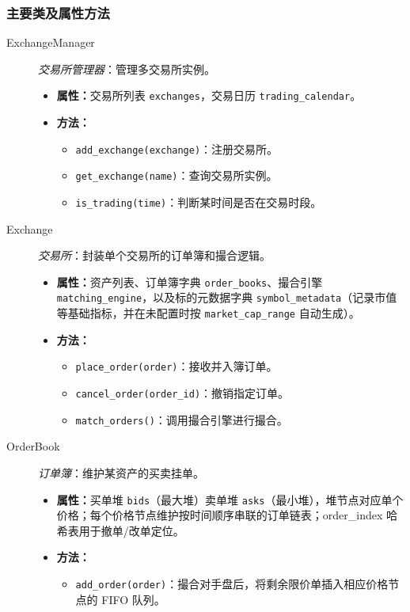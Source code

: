\subsubsection{主要类及属性方法}
\begin{description}
  \item[ExchangeManager] \emph{交易所管理器}：管理多交易所实例。
  \begin{itemize}
    \item \textbf{属性：}交易所列表 \verb|exchanges|，交易日历 \verb|trading_calendar|。
    \item \textbf{方法：}
      \begin{itemize}
        \item \verb|add_exchange(exchange)|：注册交易所。
        \item \verb|get_exchange(name)|：查询交易所实例。
        \item \verb|is_trading(time)|：判断某时间是否在交易时段。
      \end{itemize}
  \end{itemize}
  \item[Exchange] \emph{交易所}：封装单个交易所的订单簿和撮合逻辑。
  \begin{itemize}
    \item \textbf{属性：}资产列表、订单簿字典 \verb|order_books|、撮合引擎 \verb|matching_engine|，以及标的元数据字典 \verb|symbol_metadata|（记录市值等基础指标，并在未配置时按 \verb|market_cap_range| 自动生成）。
    \item \textbf{方法：}
      \begin{itemize}
        \item \verb|place_order(order)|：接收并入簿订单。
        \item \verb|cancel_order(order_id)|：撤销指定订单。
        \item \verb|match_orders()|：调用撮合引擎进行撮合。
      \end{itemize}
  \end{itemize}
  \item[OrderBook] \emph{订单簿}：维护某资产的买卖挂单。
  \begin{itemize}
    \item \textbf{属性：}买单堆 \verb|bids|（最大堆）卖单堆 \verb|asks|（最小堆），堆节点对应单个价格；每个价格节点维护按时间顺序串联的订单链表；order\_index 哈希表用于撤单/改单定位。
    \item \textbf{方法：}
      \begin{itemize}
        \item \verb|add_order(order)|：撮合对手盘后，将剩余限价单插入相应价格节点的 FIFO 队列。

\end{itemize}
\end{itemize}
\end{description}
